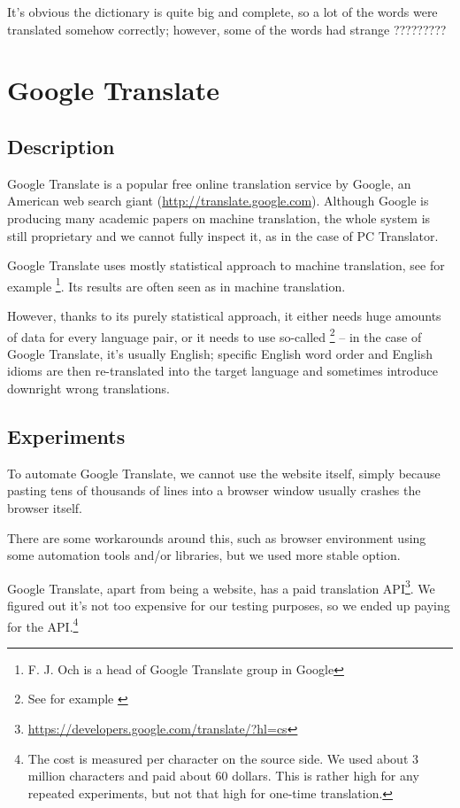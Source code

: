 It's obvious the dictionary is quite big and complete, so a lot of the words were translated somehow correctly; however, some of the words had strange ?????????


\section{Google Translate}
\subsection{Description}
Google Translate is a popular free online translation service by Google, an American web search giant (\url{http://translate.google.com}). 
Although Google is producing many academic papers on machine translation, the whole system is still proprietary and we cannot fully inspect it, as in the case of PC Translator.

Google Translate uses mostly statistical approach to machine translation, see for example \cite{och}\footnote{F. J. Och is a head of Google Translate group in Google}. Its results are often seen as  in machine translation.

However, thanks to its purely statistical approach, it either needs huge amounts of data for every language pair, or it needs to use so-called \footnote{See for example \cite{koehn2010statistical}} -- in the case of Google Translate, it's usually English; specific English word order and English idioms are then re-translated into the target language and sometimes introduce downright wrong translations.

\subsection{Experiments}
To automate Google Translate, we cannot use the website itself, simply because pasting tens of thousands of lines into a browser window usually crashes the browser itself.

There are some workarounds around this, such as  browser environment using some automation tools and/or libraries, but we used more stable option.

Google Translate, apart from being a website, has a paid translation API\footnote{\url{https://developers.google.com/translate/?hl=cs}}. We figured out it's not too expensive for our testing purposes, so we ended up paying for the API.\footnote{The cost is measured per character on the source side. We used about 3 million characters and paid about 60 dollars. This is rather high for any repeated experiments, but not that high for one-time translation.}

